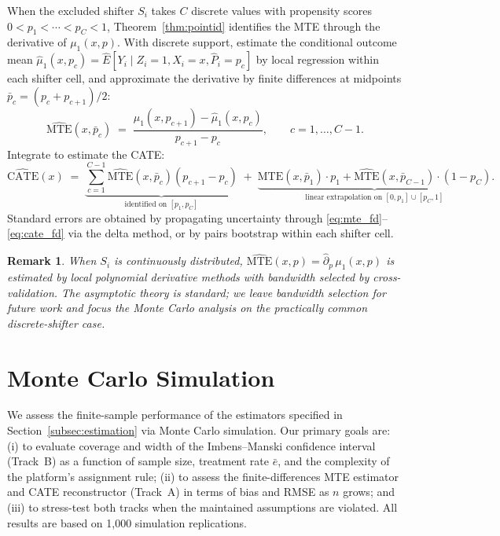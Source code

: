 \documentclass[11pt]{article}
\newtheorem{remark}{Remark}
\begin{document}
When the excluded shifter $S_i$ takes $C$ discrete values with propensity
scores $0 < p_1 < \cdots < p_C < 1$, Theorem~\ref{thm:pointid} identifies the
MTE through the derivative of $\mu_1(x,p)$.  With discrete support, estimate
the conditional outcome mean $\hat{\mu}_1(x, p_c) = \hat{E}[Y_i \mid Z_i=1,
X_i=x, \hat{P}_i = p_c]$ by local regression within each shifter cell, and
approximate the derivative by finite differences at midpoints
$\bar{p}_c = (p_c + p_{c+1})/2$:
\begin{equation}
  \hat{\mathrm{MTE}}(x, \bar{p}_c) \;=\; \frac{\hat{\mu}_1(x, p_{c+1}) -
  \hat{\mu}_1(x, p_c)}{p_{c+1} - p_c}, \qquad c = 1, \ldots, C-1.
  \label{eq:mte_fd}
\end{equation}
Integrate to estimate the CATE:
\begin{equation}
  \hat{\mathrm{CATE}}(x) \;=\; \underbrace{\sum_{c=1}^{C-1}
    \hat{\mathrm{MTE}}(x,\bar{p}_c)(p_{c+1}-p_c)}_{\text{identified on }
    [p_1,p_C]}
  \;+\; \underbrace{\hat{\mathrm{MTE}}(x,\bar{p}_1)\cdot p_1 +
    \hat{\mathrm{MTE}}(x,\bar{p}_{C-1})\cdot(1-p_C)}_{\text{linear
    extrapolation on }[0,p_1]\cup[p_C,1]}.
  \label{eq:cate_fd}
\end{equation}
Standard errors are obtained by propagating uncertainty through
\eqref{eq:mte_fd}--\eqref{eq:cate_fd} via the delta method, or by pairs
bootstrap within each shifter cell.

\begin{remark}
When $S_i$ is continuously distributed, $\hat{\mathrm{MTE}}(x,p) =
\hat{\partial}_p\,\mu_1(x,p)$ is estimated by local polynomial derivative
methods \citep{fan1996local} with bandwidth selected by cross-validation.  The
asymptotic theory is standard; we leave bandwidth selection for future work and
focus the Monte Carlo analysis on the practically common discrete-shifter case.
\end{remark}

\section{Monte Carlo Simulation}
\label{sec:mc}

We assess the finite-sample performance of the estimators specified in
Section~\ref{subsec:estimation} via Monte Carlo simulation.  Our primary goals
are: (i) to evaluate coverage and width of the Imbens--Manski confidence interval
(Track~B) as a function of sample size, treatment rate $\bar{e}$, and the
complexity of the platform's assignment rule; (ii) to assess the finite-differences
MTE estimator and CATE reconstructor (Track~A) in terms of bias and RMSE as $n$
grows; and (iii) to stress-test both tracks when the maintained assumptions are
violated.  All results are based on 1,000 simulation replications.
\end{document}
